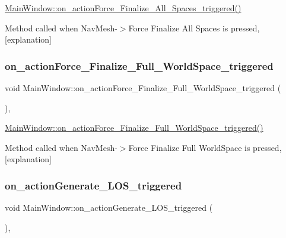 \hyperlink{class_main_window_a2ac15d9b187bae1395956be2636bf84b}{Main\+Window\+::on\+\_\+action\+Force\+\_\+\+Finalize\+\_\+\+All\+\_\+\+Spaces\+\_\+triggered()} 

Method called when Nav\+Mesh-\/$>$Force Finalize All Spaces is pressed, \mbox{[}explanation\mbox{]} \mbox{\label{class_main_window_a39ce027d7a98f94efdb5dce1204c6b76}} 
\subsubsection{\texorpdfstring{on\+\_\+action\+Force\+\_\+\+Finalize\+\_\+\+Full\+\_\+\+World\+Space\+\_\+triggered}{on\_actionForce\_Finalize\_Full\_WorldSpace\_triggered}}
{\footnotesize\ttfamily void Main\+Window\+::on\+\_\+action\+Force\+\_\+\+Finalize\+\_\+\+Full\+\_\+\+World\+Space\+\_\+triggered (\begin{DoxyParamCaption}{ }\end{DoxyParamCaption})\hspace{0.3cm}{\ttfamily [private]}, {\ttfamily [slot]}}



\hyperlink{class_main_window_a39ce027d7a98f94efdb5dce1204c6b76}{Main\+Window\+::on\+\_\+action\+Force\+\_\+\+Finalize\+\_\+\+Full\+\_\+\+World\+Space\+\_\+triggered()} 

Method called when Nav\+Mesh-\/$>$Force Finalize Full World\+Space is pressed, \mbox{[}explanation\mbox{]} \mbox{\label{class_main_window_a3710309f29e6b68d71991f67bb29b069}} 
\subsubsection{\texorpdfstring{on\+\_\+action\+Generate\+\_\+\+L\+O\+S\+\_\+triggered}{on\_actionGenerate\_LOS\_triggered}}
{\footnotesize\ttfamily void Main\+Window\+::on\+\_\+action\+Generate\+\_\+\+L\+O\+S\+\_\+triggered (\begin{DoxyParamCaption}{ }\end{DoxyParamCaption})\hspace{0.3cm}{\ttfamily [private]}, {\ttfamily [slot]}}



